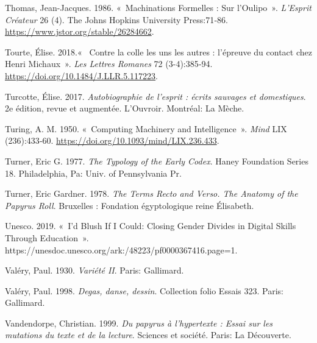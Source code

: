 \begin{CSLReferences}{1}{0}
\leavevmode{}%
Thomas, Jean-Jacques. 1986. {«~Machinations Formelles : Sur
l'{Oulipo}~»}. \emph{L'Esprit Cr{é}ateur} 26 (4). {The Johns Hopkins
University Press}:71‑86. \url{https://www.jstor.org/stable/26284662}.

\leavevmode{}%
Tourte, Élise. 2018.{«~{{\guillemotleft} Contre la colle les uns les
autres {\guillemotright} : l'{é}preuve du contact chez Henri
Michaux}~»}. \emph{Les Lettres Romanes} 72 (3-4):385‑94.
\url{https://doi.org/10.1484/J.LLR.5.117223}.

\leavevmode{}%
Turcotte, Élise. 2017. \emph{{Autobiographie de l'esprit : {é}crits
sauvages et domestiques}}. 2e {é}dition, revue et augment{é}e.
{L'Ouvroir}. {Montr{é}al}: {La M{è}che}.

\leavevmode{}%
Turing, A. M. 1950. {«~Computing {Machinery} and {Intelligence}~»}.
\emph{Mind} LIX (236):433‑60.
\url{https://doi.org/10.1093/mind/LIX.236.433}.

\leavevmode{}%
Turner, Eric G. 1977. \emph{The Typology of the Early Codex}. Haney
{Foundation Series} 18. {Philadelphia, Pa}: {Univ. of Pennsylvania Pr}.

\leavevmode{}%
Turner, Eric Gardner. 1978. \emph{The {Terms Recto} and {Verso}. {The
Anatomy} of the {Papyrus Roll}}. {Bruxelles : Fondation {é}gyptologique
reine {É}lisabeth}.

\leavevmode{}%
Unesco. 2019. {«~I'd {Blush If I Could}: {Closing Gender Divides} in
{Digital Skills Through Education}~»}.
https://unesdoc.unesco.org/ark:/48223/pf0000367416.page=1.

\leavevmode{}%
Valéry, Paul. 1930. \emph{{Vari{é}t{é} II}}. {Paris}: {Gallimard}.

\leavevmode{}%
Valéry, Paul. 1998. \emph{{Degas, danse, dessin}}. {Collection folio
Essais} 323. {Paris}: {Gallimard}.

\leavevmode{}%
Vandendorpe, Christian. 1999. \emph{{Du papyrus {à} l'hypertexte : Essai
sur les mutations du texte et de la lecture}}. {Sciences et
soci{é}t{é}}. {Paris}: {La D{é}couverte}.


\end{CSLReferences}
